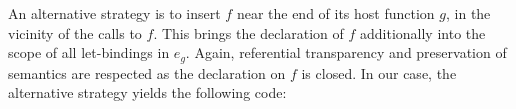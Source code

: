 {An alternative strategy is to insert $f$ near the end of its host
function $g$, in the vicinity of the calls to $f$\!. This brings the
declaration of $f$ additionally into the scope of all let-bindings in
$e_g$. Again, referential transparency and preservation of semantics
are respected as the declaration on $f$ is closed. In our case, the alternative 
strategy yields the following
code:
\begin{functional}

\end{functional}}
